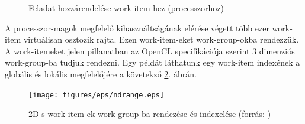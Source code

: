 	\begin{figure}[!ht]
		\centering
		\hfil
		\caption{Feladat hozzárendelése work-item-hez (processzorhoz)}
		\label{fig:parallel}
	\end{figure}
	A processzor-magok megfelelő kihasználtságának elérése végett több ezer
	work-item virtuálisan osztozik rajta.
	Ezen work-item-eket work-group-okba rendezzük.
	A work-itemeket jelen pillanatban az OpenCL specifikációja \cite{opencl} szerint $3$ dimenziós
	work-group-ba tudjuk rendezni. Egy példát láthatunk egy work-item indexének a globális és lokális megfelelőjére a
	követekző \ref{fig:ndrange}. ábrán.
	
	\begin{figure}[!h]
		\centering
		\texttt{[image: figures/eps/ndrange.eps]}
		\caption{2D-s work-item-ek work-group-ba rendezése és indexelése (forrás: \cite{opencl})} 
		\label{fig:ndrange} 
	\end{figure}
	
